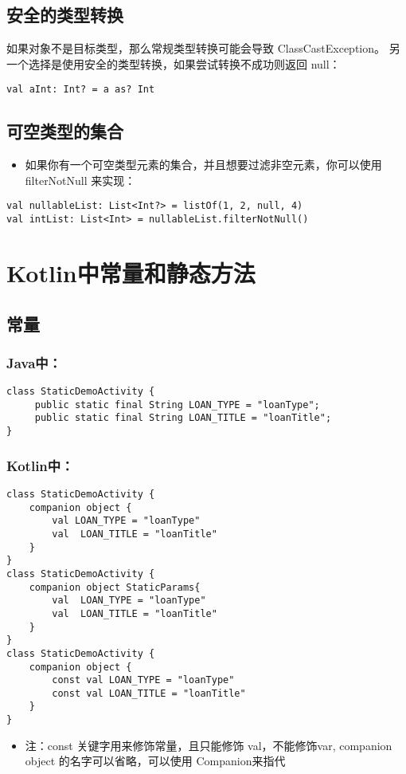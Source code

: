 \documentclass[9pt, b5paper]{article}
\begin{document}
\subsection{安全的类型转换}
\label{sec-1-6}
如果对象不是目标类型，那么常规类型转换可能会导致 ClassCastException。 另一个选择是使用安全的类型转换，如果尝试转换不成功则返回 null：
\begin{verbatim}
val aInt: Int? = a as? Int
\end{verbatim}

\subsection{可空类型的集合}
\label{sec-1-7}
\begin{itemize}
\item 如果你有一个可空类型元素的集合，并且想要过滤非空元素，你可以使用 filterNotNull 来实现：
\end{itemize}
\begin{verbatim}
val nullableList: List<Int?> = listOf(1, 2, null, 4)
val intList: List<Int> = nullableList.filterNotNull()
\end{verbatim}
\section{Kotlin中常量和静态方法}
\label{sec-2}
\subsection{常量}
\label{sec-2-1}
\subsubsection{Java中：}
\label{sec-2-1-1}
\begin{verbatim}
class StaticDemoActivity {
     public static final String LOAN_TYPE = "loanType";
     public static final String LOAN_TITLE = "loanTitle";
}
\end{verbatim}
\subsubsection{Kotlin中：}
\label{sec-2-1-2}
\begin{verbatim}
class StaticDemoActivity {
    companion object {
        val LOAN_TYPE = "loanType"
        val  LOAN_TITLE = "loanTitle"
    }
}
class StaticDemoActivity {
    companion object StaticParams{
        val  LOAN_TYPE = "loanType"
        val  LOAN_TITLE = "loanTitle"
    }
}
class StaticDemoActivity {
    companion object {
        const val LOAN_TYPE = "loanType"
        const val LOAN_TITLE = "loanTitle"
    }
}
\end{verbatim}
\begin{itemize}
\item 注：const 关键字用来修饰常量，且只能修饰 val，不能修饰var, companion object 的名字可以省略，可以使用 Companion来指代
\end{itemize}
\end{document}
